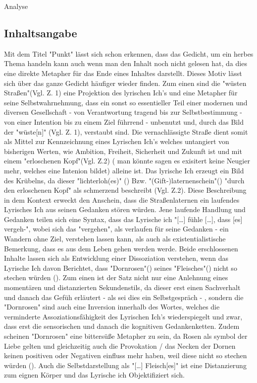 \documentclass[11pt,a4paper,oneside]{article}
\begin{document}
\begin{loesung}{Analyse}
		\subsection*{Inhaltsangabe}
		Mit dem Titel "Punkt" lässt sich schon erkennen, dass das Gedicht, um ein herbes Thema handeln kann auch wenn man den Inhalt noch nicht gelesen hat, da dies eine direkte Metapher für das Ende eines Inhaltes darstellt. Dieses Motiv lässt sich über das ganze Gedicht häufiger wieder finden. Zum einen sind die "wüsten Straßen"(Vgl. Z. 1) eine Projektion des lyrischen Ich's und eine Metapher für seine Selbstwahrnehmung, dass ein sonst so essentieller Teil einer modernen und diversen Gesellschaft - von Verantwortung tragend bis zur Selbstbestimmung -  von einer Intention bis zu einem Ziel führrend - unbenutzt und, durch das Bild der "wüste[n]" (Vgl. Z. 1), verstaubt sind. Die vernachlässigte Straße dient somit als Mittel zur Kennzeichnung eines Lyrischen Ich's welches untangiert von bisherigen Werten, wie Ambition, Freiheit, Sicherheit und Zukunft ist und mit einem "erloschenen Kopf"(Vgl. Z.2) ( man könnte sagen es exisitert keine Neugier mehr, welches eine Intenion bildet) alleine ist. Das lyrische Ich erzeugt ein Bild des Krübelns, da dieser "lichterloh(es)" () Bzw. "(Gift-)laternenschein"() "durch den erloschenen Kopf" als schmerzend beschreibt (Vgl. Z.2). Diese Beschreibung in dem Kontext erweckt den Anschein, dass die Straßenlaternen ein laufendes Lyrisches Ich aus seinen Gedanken stören würden. Jene laufende Handlung und Gedanken teilen sich eine Syntax, dass das Lyrische ich "[…] fühle […], dass [es] vergeh-", wobei sich das "vergehen", als verlaufen für seine Gedanken - ein Wandern ohne Ziel, verstehen lassen kann, als auch als existentialistische Bemerkung, dass es aus dem Leben gehen werden werde. Beide erschlossenen Inhalte lassen sich als Entwicklung einer Dissoziation verstehen, wenn das Lyrische Ich davon Berichtet, dass "Dornrosen"() seines "Fleisches"() nicht so stechen würden (). Zum einen ist der Satz nicht nur eine Anlehnung eines  momentären und distanzierten Sekundenstils, da dieser erst einen Sachverhalt und danach das Gefüh erläutert - als sei dies ein Selbstgespräch - , sondern die "Dornrosen" sind auch eine Inversion innerhalb des Wortes, welches die verminderte Assoziationsfähigkeit des Lyrischen Ich's wiederspiegelt und zwar, dass erst die sensorischen und danach die kognitiven Gedankenketten. Zudem scheinen "Dornrosen" eine bittersüße Metapher zu sein, da Rosen als symbol der Liebe gelten und gleichzeitig auch die Provokation / das Necken der Dornen keinen positiven oder Negativen einfluss mehr haben, weil diese nicht so stechen würden (). Auch die Selbstdarstellung als "[…] Fleisch[es]" ist eine Distanzierung zum eignen Körper und das Lyrische ich Objektifiziert sich.  
		

\end{loesung}
\end{document}
